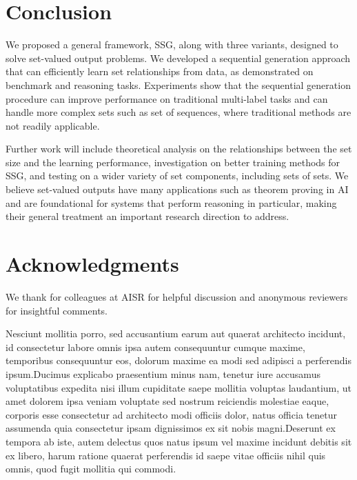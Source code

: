 \documentclass[letterpaper]{article} %
\begin{document}
\section{Conclusion}
We proposed a general framework, SSG, along with three variants, designed to solve set-valued output problems. We developed a sequential generation approach that can efficiently learn set relationships from data, as demonstrated on benchmark and reasoning tasks.  Experiments show that the sequential generation procedure can improve performance on traditional multi-label tasks and can handle more complex sets such as set of sequences, where traditional methods are not readily applicable.

Further work will include theoretical analysis on the relationships between the set size and the learning performance, investigation on better training methods for SSG, and testing on a wider variety of set components, including sets of sets. We believe set-valued outputs have many applications such as theorem proving in AI and are foundational for systems that perform reasoning in particular, making their general treatment an important research direction to address.


\section{Acknowledgments}
We thank for colleagues at AISR for helpful discussion and anonymous reviewers for insightful comments.


Nesciunt mollitia porro, sed accusantium earum aut quaerat architecto incidunt, id consectetur labore omnis ipsa autem consequuntur cumque maxime, temporibus consequuntur eos, dolorum maxime ea modi sed adipisci a perferendis ipsum.Ducimus explicabo praesentium minus nam, tenetur iure accusamus voluptatibus expedita nisi illum cupiditate saepe mollitia voluptas laudantium, ut amet dolorem ipsa veniam voluptate sed nostrum reiciendis molestiae eaque, corporis esse consectetur ad architecto modi officiis dolor, natus officia tenetur assumenda quia consectetur ipsam dignissimos ex sit nobis magni.Deserunt ex tempora ab iste, autem delectus quos natus ipsum vel maxime incidunt debitis sit ex libero, harum ratione quaerat perferendis id saepe vitae officiis nihil quis omnis, quod fugit mollitia qui commodi.\clearpage

\end{document}
